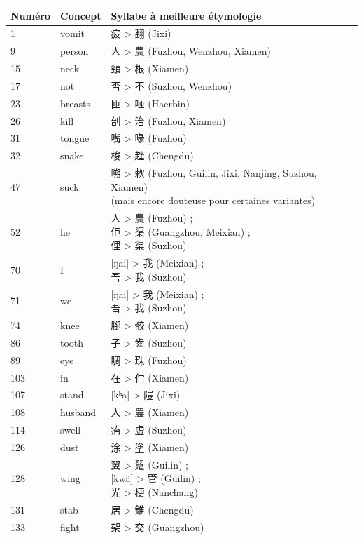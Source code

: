 \documentclass{scrbook}
\newcounter{c}[subsubsection]
\begin{document}
\begin{sloppypar}
\begin{longtable}[htbp]{lll}
    
    \toprule
    Numéro & Concept & Syllabe à meilleure étymologie \\
    \midrule
    1     & vomit & 㽹 > 翻 (Jixi) \\
    9     & person & 人 > 農 (Fuzhou, Wenzhou, Xiamen) \\
    15    & neck  & 頸 > 根 (Xiamen) \\
    17    & not   & 否 > 不 (Suzhou, Wenzhou) \\
    23    & breasts & 匝 > 咂 (Haerbin) \\
    26    & kill  & 刣 > 治 (Fuzhou, Xiamen) \\
    31    & tongue & 嘴 > 喙 (Fuzhou) \\
    32    & snake & 梭 > 趖 (Chengdu) \\
    47    & suck  & \makecell[l]{嗍 > 欶 (Fuzhou, Guilin, Jixi, Nanjing, Suzhou, Xiamen) \\(mais encore douteuse pour certaines variantes)} \\
    52    & he    & \makecell[l]{人 > 農 (Fuzhou) ; \\佢 > 渠 (Guangzhou, Meixian) ; \\俚 > 渠 (Suzhou)} \\
    70    & I     & \makecell[l]{[ŋai] > 我 (Meixian) ; \\吾 > 我 (Suzhou)} \\
    71    & we    & \makecell[l]{[ŋai] > 我 (Meixian) ; \\吾 > 我 (Suzhou)} \\
    74    & knee  & 腳 > 骹 (Xiamen) \\
    86    & tooth & 子 > 齒 (Suzhou) \\
    89    & eye   & 睭 > 珠 (Fuzhou) \\
    103   & in    & 在 > 伫 (Xiamen) \\
    107   & stand & [kʰa] > 隑 (Jixi) \\
    108   & husband & 人 > 農 (Xiamen) \\    
    114   & swell & 㾂 > 虚 (Suzhou) \\
    126   & dust  & 涂 > 塗 (Xiamen) \\
    128   & wing  & \makecell[l]{翼 > 翨 (Guilin) ; \\{[kwã]} > 管 (Guilin) ; \\光 > 梗 (Nanchang)} \\
    131   & stab  & 居 > 錐 (Chengdu) \\
    133   & fight & 架 > 交 (Guangzhou) \\

\end{longtable}
\end{sloppypar}
\end{document}
